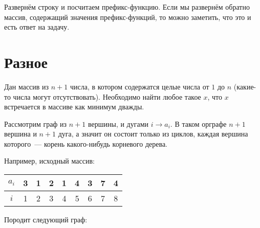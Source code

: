 \documentclass[addpoints]{exam}
\begin{document}
\begin{questions}
\begin{solution}

Развернём строку и посчитаем префикс-функцию. Если мы развернём обратно массив, содержащий значения префикс-функций, то можно заметить, что это и есть ответ на задачу.

\end{solution}

\section{Разное}

\question[3] Дан массив из $n+1$ числа, в котором содержатся целые числа от $1$ до $n$ (какие-то числа могут отсутствовать). Необходимо найти любое такое $x$, что $x$ встречается в массиве как минимум дважды.

\begin{solution}

Рассмотрим граф из $n+1$ вершины, и дугами $i \rightarrow a_i$. В таком орграфе $n+1$ вершина и $n+1$ дуга, а значит он состоит только из циклов, каждая вершина которого~--- корень какого-нибудь корневого дерева.

Например, исходный массив:

\begin{center}

\begin{tabular}{|c|c|c|c|c|c|c|c|c|}
\hline 
$a_i$ & 3 & 1 & 2 & 1 & 4 & 3 & 7 & 4 \\ 
\hline 
$i$ & 1 & 2 & 3 & 4 & 5 & 6 & 7 & 8 \\ 
\hline 
\end{tabular} 

\end{center}

Породит следующий граф:

\begin{center}

\end{center}
\end{solution}
\end{questions}
\end{document}
